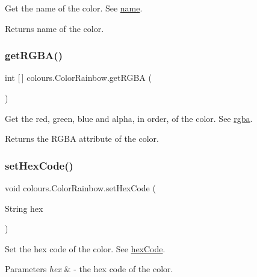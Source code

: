 Get the name of the color. See \hyperlink{classcolours_1_1_color_rainbow_a829067e626095a0cb25ef7f708ddccb3}{name}. \begin{DoxyReturn}{Returns}
name of the color. 
\end{DoxyReturn}
\mbox{\label{classcolours_1_1_color_rainbow_a5db769528ebfc07663a3581cdd547aae}} 
\subsubsection{\texorpdfstring{get\+R\+G\+B\+A()}{getRGBA()}}
{\footnotesize\ttfamily int \mbox{[}$\,$\mbox{]} colours.\+Color\+Rainbow.\+get\+R\+G\+BA (\begin{DoxyParamCaption}{ }\end{DoxyParamCaption})\hspace{0.3cm}{\ttfamily [inline]}}

Get the red, green, blue and alpha, in order, of the color. See \hyperlink{classcolours_1_1_color_rainbow_aea1f40a66bcc34656e109edcc9cf86dd}{rgba}. \begin{DoxyReturn}{Returns}
the R\+G\+BA attribute of the color. 
\end{DoxyReturn}
\mbox{\label{classcolours_1_1_color_rainbow_aaf06ae34e7cffbf90e25de191b815527}} 
\subsubsection{\texorpdfstring{set\+Hex\+Code()}{setHexCode()}}
{\footnotesize\ttfamily void colours.\+Color\+Rainbow.\+set\+Hex\+Code (\begin{DoxyParamCaption}\item[{String}]{hex }\end{DoxyParamCaption})\hspace{0.3cm}{\ttfamily [inline]}}

Set the hex code of the color. See \hyperlink{classcolours_1_1_color_rainbow_ae74af795ded4a45f8bffdc26f971903a}{hex\+Code}. 
\begin{DoxyParams}{Parameters}
{\em hex} & -\/ the hex code of the color. \\
\hline
\end{DoxyParams}
\mbox{\label{classcolours_1_1_color_rainbow_a85293b45ccd52f616154c816284ef58d}} 
